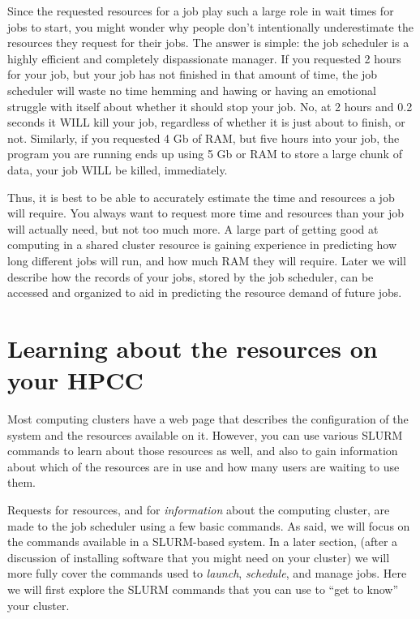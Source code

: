 \documentclass[]{krantz}
\begin{document}
Since the requested resources for a job play such a large role in wait times for jobs to start,
you might wonder why people don't intentionally underestimate the resources they request for their
jobs. The answer is simple: the job scheduler is a highly efficient and completely dispassionate
manager. If you requested 2 hours for your job, but your job has not finished in that amount of time,
the job scheduler will waste no time hemming and hawing or having an emotional struggle with itself
about whether it should stop your job. No, at 2 hours and 0.2 seconds it WILL kill your job, regardless
of whether it is just about to finish, or not. Similarly, if you requested 4 Gb of RAM, but five hours into
your job, the program you are running ends up using 5 Gb or RAM to store a large chunk of data, your
job WILL be killed, immediately.

Thus, it is best to be able to accurately estimate the time and resources a job will
require. You always want to request more time and resources than your job will
actually need, but not too much more. A large part of getting good at computing
in a shared cluster resource is gaining experience in predicting how long different jobs will
run, and how much RAM they will require. Later we will describe how the records of your
jobs, stored by the job scheduler, can be accessed and organized to aid in predicting
the resource demand of future jobs.

\hypertarget{slurm-info}{%
\section{Learning about the resources on your HPCC}\label{slurm-info}}

Most computing clusters have a web page that describes the configuration of the system
and the resources available on it. However, you can use various SLURM commands to
learn about those resources as well, and also to gain information about which
of the resources are in use and how many users are waiting to use them.

Requests for resources, and for \emph{information} about the computing cluster, are made to the job scheduler
using a few basic commands. As said, we will focus on the commands available in a SLURM-based system.
In a later section, (after a discussion of installing software that you might need on your cluster)
we will more fully cover the commands used to \emph{launch}, \emph{schedule}, and manage jobs. Here
we will first explore the SLURM commands that
you can use to ``get to know'' your cluster.
\end{document}
